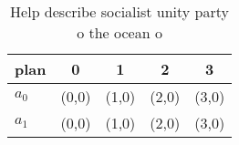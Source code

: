 \documentclass[a4paper]{article}
\begin{document}
\begin{table}
\begin{adjustbox}{width=0.7\columnwidth}
\begin{tabular}{|l|l|l|l|l|}
\hline
\textbf{plan} & \multicolumn{1}{c|}{\textbf{0}} & \multicolumn{1}{c|}{\textbf{1}} & \multicolumn{1}{c|}{\textbf{2}} & \multicolumn{1}{c|}{\textbf{3}} \\ \hline
\textbf{$a_0$}  & (0,0) & (1,0) & (2,0) & (3,0) \\ \hline
\textbf{$a_1$}  & (0,0) & (1,0) & (2,0) & (3,0) \\ \hline
\end{tabular}
\end{adjustbox}
\caption{Help describe socialist unity party o the ocean o
}
\end{table}
\end{document}
